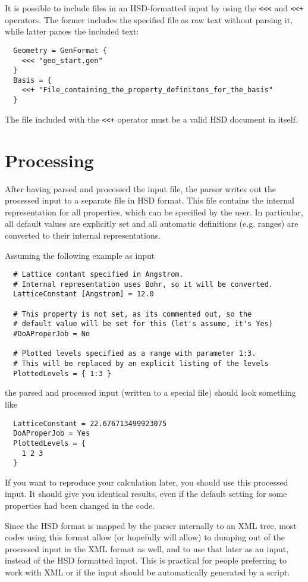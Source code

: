 It is possible to include files in an HSD-formatted input by using the
\verb|<<<| and \verb|<<+| operators. The former includes the specified
file as raw text without parsing it, while latter parses the included
text:
\begin{verbatim}
  Geometry = GenFormat {
    <<< "geo_start.gen"
  }
  Basis = {
    <<+ "File_containing_the_property_definitons_for_the_basis"
  }
\end{verbatim}
The file included with the \verb|<<+| operator must be a valid HSD
document in itself.


\section{Processing}

After having parsed and processed the input file, the parser writes
out the processed input to a separate file in HSD format. This file
contains the internal representation for all properties, which can be
specified by the user. In particular, all default values are explicitly
set and all automatic definitions (e.g. ranges) are converted to their
internal representations.

Assuming the following example as input
\begin{verbatim}
  # Lattice contant specified in Angstrom.
  # Internal representation uses Bohr, so it will be converted.
  LatticeConstant [Angstrom] = 12.0
                    
  # This property is not set, as its commented out, so the 
  # default value will be set for this (let's assume, it's Yes)
  #DoAProperJob = No

  # Plotted levels specified as a range with parameter 1:3.
  # This will be replaced by an explicit listing of the levels
  PlottedLevels = { 1:3 }
\end{verbatim}
the parsed and processed input (written to a special file) should look
something like
\begin{verbatim}
  LatticeConstant = 22.676713499923075
  DoAProperJob = Yes
  PlottedLevels = {
    1 2 3
  }
\end{verbatim}
If you want to reproduce your calculation later, you should use this
processed input. It should give you identical results, even if the
default setting for some properties had been changed in the code.

Since the HSD format is mapped by the parser internally to an XML
tree, most codes using this format allow (or hopefully will allow) to
dumping out of the processed input in the XML format as well, and to
use that later as an input, instead of the HSD formatted input. This
is practical for people preferring to work with XML or if the input
should be automatically generated by a script.



